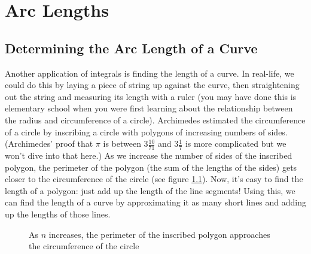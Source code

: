 \chapter{Arc Lengths}

\section{Determining the Arc Length of a Curve}

Another application of integrals is finding the length of a curve. In 
real-life, we could do this by laying a piece of string up against 
the curve, then straightening out the string and measuring its length 
with a ruler (you may have done this is elementary school when you 
were first learning about the relationship between the radius and 
circumference of a circle). Archimedes estimated the circumference of 
a circle by inscribing a circle with polygons of increasing numbers 
of sides. (Archimedes' proof that $\pi$ is between $3 \frac{10}{71}$ 
and $3 \frac{1}{7}$ is more complicated but we won't dive into that 
here.) As we increase the number of sides of the inscribed polygon, 
the perimeter of the polygon (the sum of the lengths of the sides) 
gets closer to the circumference of the circle (see figure 
\ref{fig:circles}). Now, it's easy to find the length of a polygon: 
just add up the length of the line segments! Using this, we can find 
the length of a curve by approximating it as many short lines and 
adding up the lengths of those lines. 

\begin{figure}[htbp]
\centering
    \caption{As $n$ increases, the perimeter of the inscribed polygon 
    approaches the circumference of the circle}
    \label{fig:circles}
\end{figure}

